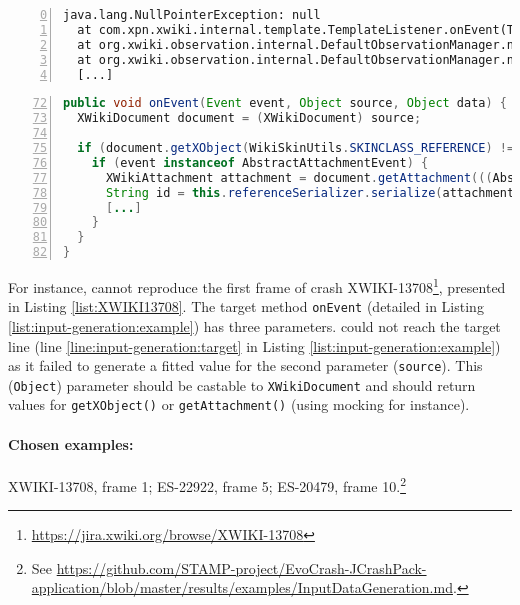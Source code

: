 \begin{lstlisting}[frame=tb,
  caption={Excerpt of the stack trace for the crash XWIKI-13708},
  label=list:XWIKI13708,
  captionpos=t,
  numbers=left,
  float=t,
  firstnumber=0]
java.lang.NullPointerException: null
  at com.xpn.xwiki.internal.template.TemplateListener.onEvent(TemplateListener.java:79)
  at org.xwiki.observation.internal.DefaultObservationManager.notify([...]:307)
  at org.xwiki.observation.internal.DefaultObservationManager.notify([...]:269)
  [...]
\end{lstlisting}

\begin{lstlisting}[frame=tb,
  caption={Code excerpt from method \texttt{onEvent} in \texttt{TemplateListener.java}},
  label=list:input-generation:example,
  captionpos=t,
  language=Java,
  numbers=left,
  firstnumber=72,
  float=t,
  stepnumber=1]
public void onEvent(Event event, Object source, Object data) {
  XWikiDocument document = (XWikiDocument) source;

  if (document.getXObject(WikiSkinUtils.SKINCLASS_REFERENCE) != null) {
    if (event instanceof AbstractAttachmentEvent) {
      XWikiAttachment attachment = document.getAttachment(((AbstractAttachmentEvent) event).getName());
      String id = this.referenceSerializer.serialize(attachment.getReference()); // target line *\label{line:input-generation:target}*
      [...]
    }
  }
}
\end{lstlisting}

For instance, \evocrash cannot reproduce the first frame of crash XWIKI-13708\footnote{\url{https://jira.xwiki.org/browse/XWIKI-13708}}, presented in Listing \ref{list:XWIKI13708}. The target method \texttt{onEvent} (detailed in Listing \ref{list:input-generation:example}) has three parameters.
\evocrash could not reach the target line (line \ref{line:input-generation:target} in Listing \ref{list:input-generation:example}) as it failed to generate a fitted value for the second parameter (\texttt{source}). This (\texttt{Object}) parameter should be castable to \texttt{XWikiDocument} and should return values for \texttt{getXObject()} or \texttt{getAttachment()} (using mocking for instance).

\paragraph{Chosen examples:} 
XWIKI-13708, frame 1;
ES-22922, frame 5;
ES-20479, frame 10.\footnote{See \url{https://github.com/STAMP-project/EvoCrash-JCrashPack-application/blob/master/results/examples/InputDataGeneration.md}.}


